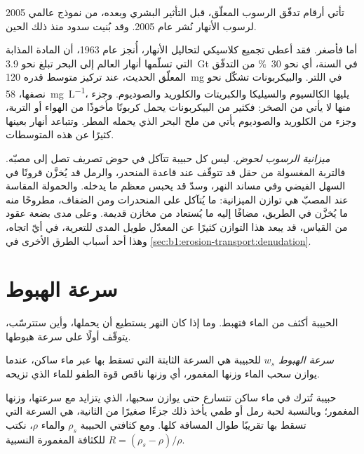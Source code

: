 \begin{dated}{2005}
تأتي أرقام تدفّق الرسوب المعلّق، قبل التأثير البشري وبعده، من نموذج عالمي لرسوب الأنهار نُشر عام 2005. وقد بُنيت سدود منذ ذلك الحين.
\end{dated}

أما  فأصغر. فقد أعطى تجميع كلاسيكي لتحاليل الأنهار، أُنجز عام 1963، أن المادة المذابة التي تسلّمها أنهار العالم إلى البحر تبلغ نحو \qty{3.9}{Gt} في السنة، أي نحو \qty{30}{\percent} من التدفّق المعلّق الحديث، عند تركيز متوسط قدره \qty{120}{mg} في اللتر. والبيكربونات تشكّل نحو نصفها، \qty{58}{mg.L^{-1}}، يليها الكالسيوم والسيليكا والكبريتات والكلوريد والصوديوم. وجزء منها لا يأتي من الصخر: فكثير من البيكربونات يحمل كربونًا مأخوذًا من الهواء أو التربة، وجزء من الكلوريد والصوديوم يأتي من ملح البحر الذي يحمله المطر. وتتباعد أنهار بعينها كثيرًا عن هذه المتوسطات.

\emph{ميزانية الرسوب لحوض.} ليس كل حبيبة تتآكل في حوض تصريف تصل إلى مصبّه. فالتربة المغسولة من حقل قد تتوقّف عند قاعدة المنحدر، والرمل قد يُخزَّن قرونًا في السهل الفيضي وفي مساند النهر، وسدّ قد يحبس معظم ما يدخله. والحمولة المقاسة عند المصبّ هي توازن الميزانية: ما يُتآكل على المنحدرات ومن الضفاف، مطروحًا منه ما يُخزَّن في الطريق، مضافًا إليه ما يُستعاد من مخازن قديمة. وعلى مدى بضعة عقود من القياس، قد يبعد هذا التوازن كثيرًا عن المعدّل طويل المدى للتعرية، في أيّ اتجاه، وهذا أحد أسباب الطرق الأخرى في \cref{sec:b1:erosion-transport:denudation}.

\section{سرعة الهبوط}\label{sec:b1:erosion-transport:settling}

الحبيبة أكثف من الماء فتهبط. وما إذا كان النهر يستطيع أن يحملها، وأين ستترسّب، يتوقّف أولًا على سرعة هبوطها.

\begin{definition}\label{def:b1:erosion-transport:settling}
\emph{سرعة الهبوط} $w_s$ للحبيبة هي السرعة الثابتة التي تسقط بها عبر ماء ساكن، عندما يوازن سحب الماء وزنها المغمور، أي وزنها ناقص قوة الطفو للماء الذي تزيحه.
\end{definition}

حبيبة تُترك في ماء ساكن تتسارع حتى يوازن سحبها، الذي يتزايد مع سرعتها، وزنها المغمور؛ وبالنسبة لحبة رمل أو طمي يأخذ ذلك جزءًا صغيرًا من الثانية،  هي السرعة التي تسقط بها تقريبًا طوال المسافة كلها. ومع كثافتي الحبيبة $\rho_s$ والماء $\rho$، نكتب $R = (\rho_s - \rho)/\rho$ للكثافة المغمورة النسبية.

